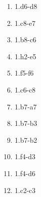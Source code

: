 \begin{enumerate}
\setcounter{enumi}{\value{d_counter}}
\item 1.\rook{}d6-d8\mate{}
\item 1.\knight{}c8-e7\mate{}
\item 1.\knight{}b8-c6\mate{}
\item 1.\bishop{}h2-e5\mate{}
\item 1.\pawn{}f5-f6\mate{}
\item 1.\rook{}c6-c8\mate{}
\item 1.\rook{}b7-a7\mate{}
\item 1.\rook{}b7-b3\mate{}
\item 1.\rook{}b7-b2\mate{}
\item 1.\knight{}f4-d3\mate{}
\item 1.\bishop{}f4-d6\mate{}
\item 1.\pawn{}c2-c3\mate{}
\setcounter{d_counter}{\value{enumi}}
\end{enumerate}